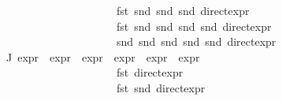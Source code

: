 \begin{isabellebody}
\ \ \ \ \ \ \ \ \ \ \ \ \ \ \ \ \ \ \ \ \ \ \ \ \ \ \ \ \ \ \ \ fst\ {\isacharparenleft}{\kern0pt}snd\ {\isacharparenleft}{\kern0pt}snd\ {\isacharparenleft}{\kern0pt}snd\ {\isacharparenleft}{\kern0pt}direct{\isacharunderscore}{\kern0pt}expr\ {\isasymphi}{\isacharparenright}{\kern0pt}{\isacharparenright}{\kern0pt}{\isacharparenright}{\kern0pt}{\isacharparenright}{\kern0pt}{\isacharcomma}{\kern0pt}\ \isanewline
\ \ \ \ \ \ \ \ \ \ \ \ \ \ \ \ \ \ \ \ \ \ \ \ \ \ \ \ \ \ \ \ fst\ {\isacharparenleft}{\kern0pt}snd\ {\isacharparenleft}{\kern0pt}snd\ {\isacharparenleft}{\kern0pt}snd\ {\isacharparenleft}{\kern0pt}snd\ {\isacharparenleft}{\kern0pt}direct{\isacharunderscore}{\kern0pt}expr\ {\isasymphi}{\isacharparenright}{\kern0pt}{\isacharparenright}{\kern0pt}{\isacharparenright}{\kern0pt}{\isacharparenright}{\kern0pt}{\isacharparenright}{\kern0pt}{\isacharcomma}{\kern0pt}\ \isanewline
\ \ \ \ \ \ \ \ \ \ \ \ \ \ \ \ \ \ \ \ \ \ \ \ \ \ \ \ \ \ \ \ snd\ {\isacharparenleft}{\kern0pt}snd\ {\isacharparenleft}{\kern0pt}snd\ {\isacharparenleft}{\kern0pt}snd\ {\isacharparenleft}{\kern0pt}snd\ {\isacharparenleft}{\kern0pt}direct{\isacharunderscore}{\kern0pt}expr\ {\isasymphi}{\isacharparenright}{\kern0pt}{\isacharparenright}{\kern0pt}{\isacharparenright}{\kern0pt}{\isacharparenright}{\kern0pt}{\isacharparenright}{\kern0pt}{\isacharparenright}{\kern0pt}{\isachardoublequoteclose}\isanewline
\ \ \ \ \ \ \ \ {\isachardoublequoteopen}{\isasymforall}{\isasymphi}\ {\isasymin}\ {\isasymPhi}\ {\isacharbackquote}{\kern0pt}\ J{\isachardot}{\kern0pt}\ {\isacharparenleft}{\kern0pt}expr{\isacharunderscore}{\kern0pt}{}\ {\isasymphi}{\isacharcomma}{\kern0pt}\ expr{\isacharunderscore}{\kern0pt}{}\ {\isasymphi}{\isacharcomma}{\kern0pt}\ expr{\isacharunderscore}{\kern0pt}{}\ {\isasymphi}{\isacharcomma}{\kern0pt}\ expr{\isacharunderscore}{\kern0pt}{}\ {\isasymphi}{\isacharcomma}{\kern0pt}\ expr{\isacharunderscore}{\kern0pt}{}\ {\isasymphi}{\isacharcomma}{\kern0pt}\ expr{\isacharunderscore}{\kern0pt}{}\ {\isasymphi}{\isacharparenright}{\kern0pt}\ {\isacharequal}{\kern0pt}\isanewline
\ \ \ \ \ \ \ \ \ \ \ \ \ \ \ \ \ \ \ \ \ \ \ \ \ \ \ \ \ \ \ \ {\isacharparenleft}{\kern0pt}fst\ {\isacharparenleft}{\kern0pt}direct{\isacharunderscore}{\kern0pt}expr\ {\isasymphi}{\isacharparenright}{\kern0pt}{\isacharcomma}{\kern0pt}\ \isanewline
\ \ \ \ \ \ \ \ \ \ \ \ \ \ \ \ \ \ \ \ \ \ \ \ \ \ \ \ \ \ \ \ fst\ {\isacharparenleft}{\kern0pt}snd\ {\isacharparenleft}{\kern0pt}direct{\isacharunderscore}{\kern0pt}expr\ {\isasymphi}{\isacharparenright}{\kern0pt}{\isacharparenright}{\kern0pt}{\isacharcomma}{\kern0pt}\ \isanewline

\end{isabellebody}

